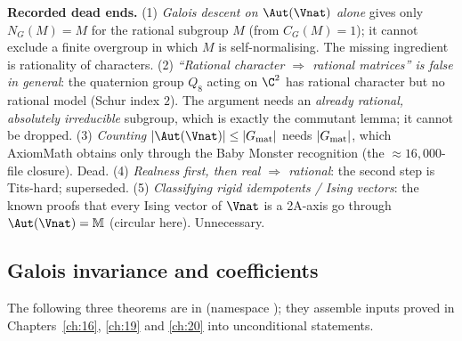 \begin{warning}
\textbf{Recorded dead ends.}
(1) \emph{Galois descent on $\Aut(\Vnat)$ alone} gives only $N_G(M)=M$ for the rational subgroup $M$ (from $C_G(M)=1$); it
cannot exclude a finite overgroup in which $M$ is self-normalising.  The missing ingredient is rationality of characters.
(2) \emph{``Rational character $\Rightarrow$ rational matrices'' is false in general}: the quaternion group $Q_8$ acting on
$\C^2$ has rational character but no rational model (Schur index $2$).  The argument needs an \emph{already rational,
absolutely irreducible} subgroup, which is exactly the commutant lemma; it cannot be dropped.
(3) \emph{Counting} $|\Aut(\Vnat)|\le|\chtwentytwoGmat|$ needs $|G_{\mathrm{mat}}|$, which AxiomMath obtains only through the
Baby Monster recognition (the $\approx16{,}000$-file closure).  Dead.
(4) \emph{Realness first, then real $\Rightarrow$ rational}: the second step is Tits-hard; superseded.
(5) \emph{Classifying rigid idempotents / Ising vectors}: the known proofs that every Ising vector of $\Vnat$ is a 2A-axis go
through $\Aut(\Vnat)=\chtwentytwoM$ (circular here).  Unnecessary.
\end{warning}

\subsection{Galois invariance and coefficients}

The following three theorems are in  (namespace
); they assemble inputs proved in Chapters~\ref{ch:16}, \ref{ch:19} and \ref{ch:20}
into unconditional statements.

